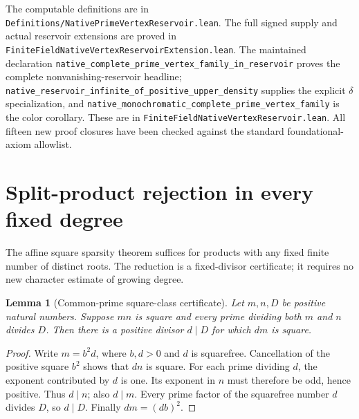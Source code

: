 \documentclass[11pt]{article}
\newtheorem{lemma}[theorem]{Lemma}
\begin{document}
The computable definitions are in
\texttt{Definitions/NativePrimeVertexReservoir.lean}.
The full signed supply and actual reservoir extensions are proved in
\texttt{FiniteFieldNativeVertexReservoirExtension.lean}.
The maintained declaration
\texttt{native\_complete\_prime\_vertex\_family\_in\_reservoir}
proves the complete nonvanishing-reservoir headline;
\texttt{native\_reservoir\_infinite\_of\_positive\_upper\_density}
supplies the explicit \(\delta\) specialization, and
\texttt{native\_monochromatic\_complete\_prime\_vertex\_family}
is the color corollary. These are in
\texttt{FiniteFieldNativeVertexReservoir.lean}.
All fifteen new proof closures have been checked against the
standard foundational-axiom allowlist.

\section{Split-product rejection in every fixed degree}
\label{sec:split-product-square-rejection}
The affine square sparsity theorem suffices for products with any fixed
finite number of distinct roots. The reduction is a fixed-divisor
certificate; it requires no new character estimate of growing degree.

\begin{lemma}[Common-prime square-class certificate]
\label{lem:common-prime-square-certificate}
Let \(m,n,D\) be positive natural numbers. Suppose \(mn\) is square
and every prime dividing both \(m\) and \(n\) divides \(D\). Then
there is a positive divisor \(d\mid D\) for which \(dm\) is square.
\end{lemma}
\begin{proof}
Write \(m=b^2d\), where \(b,d>0\) and \(d\) is squarefree.
Cancellation of the positive square \(b^2\) shows that \(dn\) is
square. For each prime dividing \(d\), the exponent contributed by
\(d\) is one. Its exponent in \(n\) must therefore be odd, hence
positive. Thus \(d\mid n\); also \(d\mid m\). Every prime factor of
the squarefree number \(d\) divides \(D\), so \(d\mid D\). Finally
\(dm=(db)^2\).
\end{proof}
\end{document}
